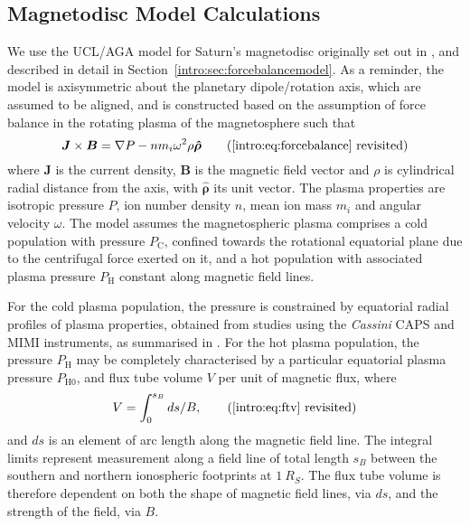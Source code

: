 \subsection{Magnetodisc Model Calculations}\label{compress:sec:model}
We use the UCL/AGA model for Saturn's magnetodisc originally set out in \citet{achilleos2010a}, and described in detail in Section~\ref{intro:sec:forcebalancemodel}. As a reminder, the model is axisymmetric about the planetary dipole/rotation axis, which are assumed to be aligned, and is constructed based on the assumption of force balance in the rotating plasma of the magnetosphere such that 
\begin{equation*}\label{compress:eq:forcebalance}
\boldsymbol{J} \times \boldsymbol{B} = \nabla P - nm_i\omega^2\rho\boldsymbol{\hat{\rho}} \tag{\ref{intro:eq:forcebalance} revisited}
\end{equation*}
where $\boldsymbol{J}$ is the current density, $\boldsymbol{B}$ is the magnetic field vector and $\rho$ is cylindrical radial distance from the axis, with $\boldsymbol{\hat{\rho}}$ its unit vector. The plasma properties are isotropic pressure $P$, ion number density $n$, mean ion mass $m_i$ and angular velocity $\omega$. The model assumes the magnetospheric plasma comprises a cold population with pressure $P_\mathrm{C}$, confined towards the rotational equatorial plane due to the centrifugal force exerted on it, and a hot population with associated plasma pressure $P_\mathrm{H}$ constant along magnetic field lines. 

For the cold plasma population, the pressure is constrained by equatorial radial profiles of plasma properties, obtained from studies using the \textit{Cassini} CAPS and MIMI instruments, as summarised in \citet{achilleos2010a,achilleos2010b}. For the hot plasma population, the pressure $P_\mathrm{H}$ may be completely characterised by a particular equatorial plasma pressure $P_\mathrm{H0}$, and flux tube volume $V$ per unit of magnetic flux, where
\begin{equation*}\label{compress:eq:ftv}
V = \int_{0}^{s_{B}} ds/B, \tag{\ref{intro:eq:ftv} revisited}
\end{equation*}
and $ds$ is an element of arc length along the magnetic field line. The integral limits represent measurement along a field line of total length $s_B$ between the southern and northern ionospheric footprints at $\SI{1}{R_S}$. The flux tube volume is therefore dependent on both the shape of magnetic field lines, via $ds$, and the strength of the field, via $B$. 

